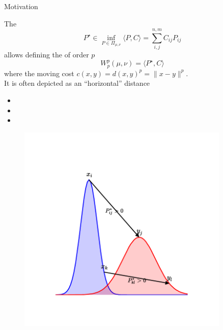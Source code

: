 \documentclass[pdf,aspectratio=169,10pt]{beamer}
\begin{document}
\begin{frame}{Motivation}
    \\
    \begin{minipage}{0.59\textwidth}
        The 
        \begin{equation*}
            P^\star \in \inf_{P\in\Pi_{\mu,\nu}} \langle P , C\rangle = \sum_{i,j}^{n,m} C_{ij}P_{ij} 
        \end{equation*}
        allows defining the  of order $p$
        \begin{equation*}
            W^p_p(\mu, \nu) =  \langle P^\star , C\rangle
        \end{equation*}
        where the moving cost $c(x, y) = {d(x, y)}^p = \| x - y \|^p$.\\
        It is often depicted as an ``horizontal'' distance
\begin{itemize}
          \item[\bred{$\checkmark$}] 
          \item[\bred{$\checkmark$}]  
          \item[\bred{$\checkmark$}] 
      \end{itemize}       
    \end{minipage}
    \hfill
    \begin{minipage}{0.4\textwidth}
    \begin{figure}
        \centering
            \includegraphics[trim={2cm 2cm 2cm 2cm},clip, width=0.9\textwidth]{../img/horizontal_distance.pdf}
        \end{figure}
        \centering
        \small
    \end{minipage}
    

\end{frame}
\end{document}
